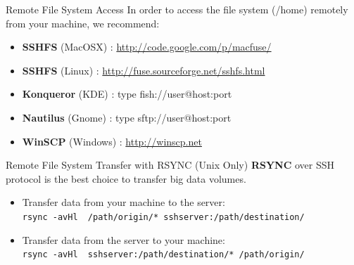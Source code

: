 \documentclass[final,t]{beamer}
\begin{document}
\begin{frame}[fragile]{}
\begin{columns}[t]
\begin{column}{.32\linewidth}
      \begin{block}{Remote File System Access}
       In order to access the file system (/home) remotely from your machine, we recommend:
        \begin{itemize}
        \item \textbf{SSHFS} (MacOSX) : \url{http://code.google.com/p/macfuse/}
        \item \textbf{SSHFS} (Linux) : \url{http://fuse.sourceforge.net/sshfs.html}
        \item \textbf{Konqueror} (KDE) : type fish://user@host:port
        \item \textbf{Nautilus} (Gnome) : type sftp://user@host:port
        \item \textbf{WinSCP} (Windows) : \url{http://winscp.net}
        \end{itemize}
      \end{block}
 
      \begin{block}{Remote File System Transfer with RSYNC (Unix Only)}
       \textbf{RSYNC} over SSH protocol is the best choice to transfer big data volumes.
        \begin{itemize}
        \item Transfer data from your machine to the server:\\ \verb|rsync -avHl  /path/origin/* sshserver:/path/destination/|
        \item Transfer data from the server to your machine:\\ \verb|rsync -avHl  sshserver:/path/destination/* /path/origin/|
        \end{itemize}
      \end{block}


\end{column}
\end{columns}
\end{frame}
\end{document}
